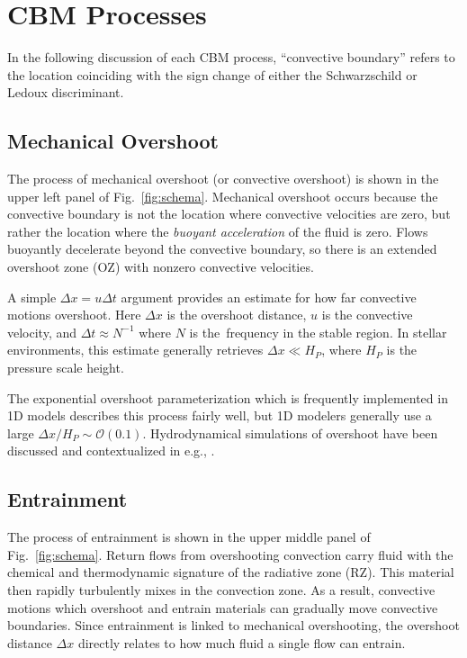 \section{CBM Processes}
\label{sec:processes}

In the following discussion of each CBM process, ``convective boundary'' refers to the location coinciding with the sign change of either the Schwarzschild or Ledoux discriminant.

\subsection{Mechanical Overshoot}
The process of mechanical overshoot (or convective overshoot) is shown in the upper left panel of Fig.~\ref{fig:schema}.
Mechanical overshoot occurs because the convective boundary is not the location where convective velocities are zero, but rather the location where the \emph{buoyant acceleration} of the fluid is zero.
Flows buoyantly decelerate beyond the convective boundary, so there is an extended overshoot zone (OZ) with nonzero convective velocities.

A simple $\Delta x = u \Delta t$ argument provides an estimate for how far convective motions overshoot.
Here $\Delta x$ is the overshoot distance, $u$ is the convective velocity, and $\Delta t \approx N^{-1}$ where $N$ is the \brunt$\,$frequency in the stable region.
In stellar environments, this estimate generally retrieves $\Delta x \ll H_P$, where $H_P$ is the pressure scale height.

The exponential overshoot parameterization \citep[per e.g.,][]{herwig_2000} which is frequently implemented in 1D models describes this process fairly well, but 1D modelers generally use a large $\Delta x/H_P \sim \mathcal{O}(0.1)$.
Hydrodynamical simulations of overshoot have been discussed and contextualized in e.g., \citet{korre_etal_2019}.


\subsection{Entrainment}
The process of entrainment is shown in the upper middle panel of Fig.~\ref{fig:schema}.
Return flows from overshooting convection carry fluid with the chemical and thermodynamic signature of the radiative zone (RZ).
This material then rapidly turbulently mixes in the convection zone.
As a result, convective motions which overshoot and entrain materials can gradually move convective boundaries.
Since entrainment is linked to mechanical overshooting, the overshoot distance $\Delta x$ directly relates to how much fluid a single flow can entrain.


